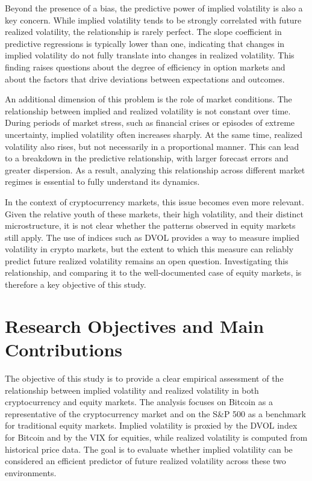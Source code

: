 \documentclass[11pt,a4paper,openany]{report}
\begin{document}
Beyond the presence of a bias, the predictive power of implied
volatility is also a key concern. While implied volatility tends to be
strongly correlated with future realized volatility, the relationship is
rarely perfect. The slope coefficient in predictive regressions is
typically lower than one, indicating that changes in implied volatility
do not fully translate into changes in realized volatility. This finding
raises questions about the degree of efficiency in option markets and
about the factors that drive deviations between expectations and
outcomes.

An additional dimension of this problem is the role of market
conditions. The relationship between implied and realized volatility is
not constant over time. During periods of market stress, such as
financial crises or episodes of extreme uncertainty, implied volatility
often increases sharply. At the same time, realized volatility also
rises, but not necessarily in a proportional manner. This can lead to a
breakdown in the predictive relationship, with larger forecast errors
and greater dispersion. As a result, analyzing this relationship across
different market regimes is essential to fully understand its dynamics.

In the context of cryptocurrency markets, this issue becomes even more
relevant. Given the relative youth of these markets, their high
volatility, and their distinct microstructure, it is not clear whether
the patterns observed in equity markets still apply. The use of indices
such as DVOL provides a way to measure implied volatility in crypto
markets, but the extent to which this measure can reliably predict
future realized volatility remains an open question. Investigating this
relationship, and comparing it to the well-documented case of equity
markets, is therefore a key objective of this study.

\section{Research Objectives and Main
Contributions}\label{research-objectives-and-main-contributions}

The objective of this study is to provide a clear empirical assessment
of the relationship between implied volatility and realized volatility
in both cryptocurrency and equity markets. The analysis focuses on
Bitcoin as a representative of the cryptocurrency market and on the S\&P
500 as a benchmark for traditional equity markets. Implied volatility is
proxied by the DVOL index for Bitcoin and by the VIX for equities, while
realized volatility is computed from historical price data. The goal is
to evaluate whether implied volatility can be considered an efficient
predictor of future realized volatility across these two environments.
\end{document}
